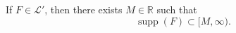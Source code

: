 If $F \in \mathcal{L}'$, then there exists $M \in \mathbb{R}$ such that
$$\operatorname{supp}(F) \subset [M, \infty).$$
